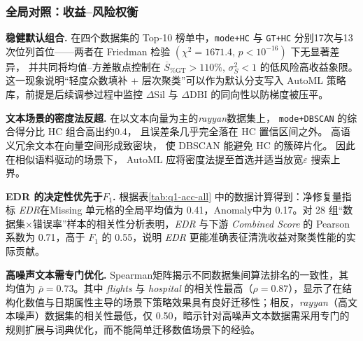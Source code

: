 \documentclass[10pt]{article} %
\numberwithin{equation}{section}
\begin{document}
\subsubsection{全局对照：收益–风险权衡}
\label{subsec:global_contrast}

\medskip
\noindent%
\textbf{稳健默认组合.}\;
在四个数据集的 Top‑10 榜单中，\texttt{mode+HC} 与 \texttt{GT+HC}
分别17次与13次位列首位——两者在 Friedman 检验
\((\chi^{2}{=}1671.4,\,p{<}10^{-16})\) 下无显著差异，
并共同将均值–方差散点控制在
\(\overline{S}_{\%\mathrm{GT}}>110\%,\,\sigma^{2}_{S}<1\) 的低风险高收益象限。
这一现象说明“轻度众数填补 + 层次聚类”可以作为默认分支写入
AutoML 策略库，前提是后续调参过程中监控
\(\Delta\mathrm{Sil}\) 与 \(\Delta\mathrm{DBI}\) 的同向性以防梯度被压平。

\medskip
\noindent%
\textbf{文本场景的密度法反超.}\;
在以文本向量为主的\textit{rayyan}数据集上，
\texttt{mode+DBSCAN} 的综合得分比 HC 组合高出约0.4，
且误差条几乎完全落在 HC 置信区间之外。
高语义冗余文本在向量空间形成致密块，
使 DBSCAN 能避免 HC 的簇碎片化。
因此在相似语料驱动的场景下，
AutoML 应将密度法提至首选并适当放宽\(\varepsilon\) 搜索上界。

\medskip
\noindent%
\textbf{EDR 的决定性优先于\(F_1\).}\;
根据表\ref{tab:q1-acc-all} 中的数据计算得到：净修复量指标 \textit{EDR}在Missing 单元格的全局平均值为 0.41，Anomaly中为 0.17。对 28 组“数据集×错误率”样本的相关性分析表明，\textit{EDR} 与下游 \textit{Combined Score} 的 Pearson 系数为 0.71，高于 \(F_1\) 的 0.55，说明 \textit{EDR} 更能准确表征清洗收益对聚类性能的实际贡献。

\medskip
\noindent%
\textbf{高噪声文本需专门优化.}\;
Spearman矩阵揭示不同数据集间算法排名的一致性，其均值为 $\bar\rho=0.73$。其中 \emph{flights} 与 \emph{hospital} 的相关性最高（$\rho=0.87$），显示了在结构化数值与日期属性主导的场景下策略效果具有良好迁移性；相反，\emph{rayyan}（高文本噪声）数据集的相关性最低，仅 0.50，暗示针对高噪声文本数据需采用专门的规则扩展与词典优化，而不能简单迁移数值场景下的经验。
\end{document}
